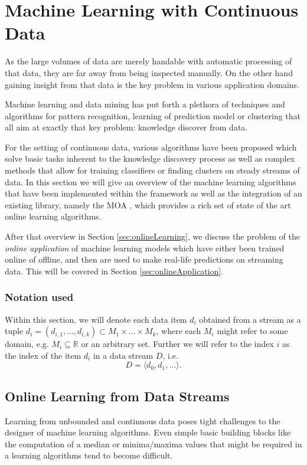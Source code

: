 \clearpage
\section{\label{sec:machineLearning}Machine Learning with Continuous Data}
As the large volumes of data are merely handable with automatic
processing of that data, they are far away from being inspected
manually. On the other hand gaining insight from that data is the key
problem in various application domains.

Machine learning and data mining has put forth a plethora of
techniques and algorithms for pattern recognition, learning of
prediction model or clustering that all aim at exactly that key
problem: knowledge discover from data.

For the setting of continuous data, various algorithms have been
proposed which solve basic tasks inherent to the knowledge discovery
process as well as complex methods that allow for training classifiers
or finding clusters on steady streams of data. In this section we will
give an overview of the machine learning algorithms that have been
implemented within the \streams framework as well as the integration
of an existing library, namely the MOA \cite{moa}, which provides a
rich set of state of the art online learning algorithms. 

After that overview in Section \ref{sec:onlineLearning}, we discuss
the problem of the {\em online application} of machine learning models
which have either been trained online of offline, and then are used to
make real-life predictions on streaming data. This will be covered in
Section \ref{sec:onlineApplication}.

\subsubsection*{Notation used}
Within this section, we will denote each data item $d_i$ obtained from
a stream as a tuple $d_i = (d_{i,1},\ldots,d_{i,k}) \subset
M_1\times\ldots\times M_k$, where each $M_i$ might refer to some
domain, e.g. $M_i \subseteq \mathbb{R}$ or an arbitrary set. Further we will refer to the index $i$ as the index of the item $d_i$ in a data stream $D$, i.e.
\begin{displaymath}
  D = \langle d_0,d_1,\ldots \rangle.
\end{displaymath}


\subsection{\label{sec:onlineLearning}Online Learning from Data Streams}
Learning from unbounded and continuous data poses tight challenges to
the designer of machine learning algorithms. Even simple basic
building blocks like the computation of a median or minima/maxima
values that might be required in a learning algorithms tend to become
difficult.


